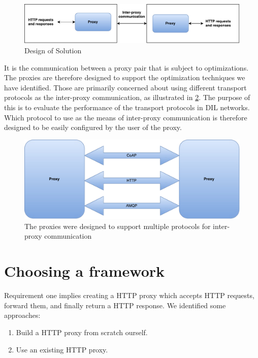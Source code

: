 \begin{figure}[h]
\includegraphics[scale=0.55]{images/proxy_design.pdf}
\caption{Design of Solution}
\label{figure:proxy_design}
\end{figure}

It is the communication between a proxy pair that is subject to optimizations.
The proxies are therefore designed to support the optimization techniques we
have identified. Those are primarily concerned about using different transport
protocols as the inter-proxy communication, as illustrated in
\cref{figure:proxy-communication}. The purpose of this is to evaluate the
performance of the transport protocols in DIL networks. Which protocol to use as
the means of inter-proxy communication is therefore designed to be easily
configured by the user of the proxy.

\begin{figure}[h]
\includegraphics[scale=0.5]{images/proxy_communcation.pdf}
\caption{The proxies were designed to support multiple protocols for inter-proxy communication}
\label{figure:proxy-communication}
\end{figure}

\section{Choosing a framework}

Requirement one implies creating a HTTP proxy which accepts HTTP requests,
forward them, and finally return a HTTP response. We identified some approaches:

\begin{enumerate}
    \item Build a HTTP proxy from scratch ourself.
    \item Use an existing HTTP proxy.
\end{enumerate}

